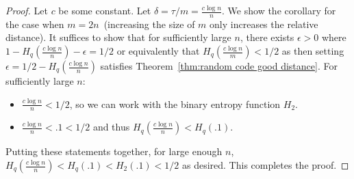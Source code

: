 \documentclass[11pt]{article}
\newcommand{\thref}[1]{\mbox{Theorem~\ref{#1}}}
\begin{document}
\begin{proof}
Let $c$ be some constant.  Let $\delta = \tau/m = \frac{c\log n}{n}$.  We show the corollary for the case when $m = 2n$~(increasing the size of $m$ only increases the relative distance).  It suffices to show that for sufficiently large $n$, there exists $\epsilon>0$ where $1- H_q(\frac{c\log n}{n}) - \epsilon = 1/2$ or equivalently that $H_q(\frac{c\log n}{m})< 1/2$ as then setting $\epsilon = 1/2-H_q(\frac{c\log n}{n})$ satisfies  \thref{thm:random code good distance}.  For sufficiently large $n$:
\begin{itemize}
\item $\frac{c\log n}{n}< 1/2$, so we can work with the binary entropy function $H_2$.  
\item $\frac{c\log n}{n}< .1 < 1/2$ and thus $H_q(\frac{c\log n}{n})< H_q(.1)$. 
\end{itemize}  Putting these statements together, for large enough $n$, $H_q(\frac{c\log n}{n})< H_q(.1) < H_2(.1)< 1/2$ as desired.  This completes the proof.

\end{proof}
\end{document}
